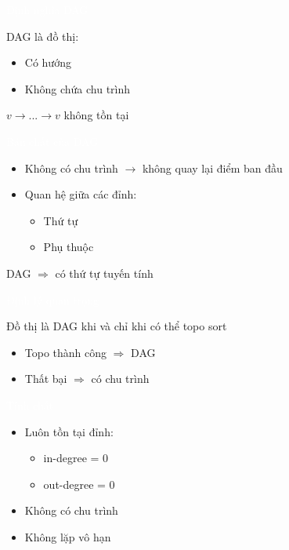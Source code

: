 \documentclass{beamer}
\title{\hlred{DAG - Directed Acyclic Graph}}
\author{Group 3}
\date{\hlcyan{03/2026}}
\newcommand{\hlblue}[1]{\textcolor{myblue}{#1}}
\newcommand{\hlgreen}[1]{\textcolor{mygreen}{#1}}
\newcommand{\hlred}[1]{\textcolor{myred}{#1}}
\newcommand{\hlpurple}[1]{\textcolor{mypurple}{#1}}
\newcommand{\hlwhite}[1]{\textcolor{white}{#1}}
\begin{document}
\frame{\titlepage}


\begin{frame}{\hlwhite{Định nghĩa DAG}}
\begin{tcolorbox}[title=\textbf{\hlgreen{Khái niệm DAG}}]
\hlblue{DAG} là đồ thị:
\begin{itemize}
\item Có hướng
\item Không chứa chu trình
\end{itemize}
\end{tcolorbox}

\begin{tcolorbox}
\centering
\hlpurple{$v \rightarrow ... \rightarrow v$ không tồn tại}
\end{tcolorbox}
\end{frame}

\begin{frame}{\hlwhite{Bản chất của DAG}}
\begin{itemize}
\item Không có chu trình $\rightarrow$ không quay lại điểm ban đầu
\item Quan hệ giữa các đỉnh:
\begin{itemize}
\item \hlblue{Thứ tự}
\item \hlblue{Phụ thuộc}
\end{itemize}
\end{itemize}

\begin{tcolorbox}
\centering
\hlpurple{DAG $\Rightarrow$ có thứ tự tuyến tính}
\end{tcolorbox}
\end{frame}

\begin{frame}{\hlwhite{Định lý quan trọng}}
\begin{tcolorbox}[title=\textbf{\hlgreen{Định lý}}]
Đồ thị là DAG \hlred{khi và chỉ khi} có thể topo sort
\end{tcolorbox}

\begin{itemize}
\item Topo thành công $\Rightarrow$ DAG
\item Thất bại $\Rightarrow$ có chu trình
\end{itemize}
\end{frame}

\begin{frame}{\hlwhite{Tính chất}}
\begin{itemize}
\item Luôn tồn tại đỉnh:
\begin{itemize}
\item \hlblue{in-degree = 0}
\item \hlgreen{out-degree = 0}
\end{itemize}
\item Không có chu trình
\item Không lặp vô hạn
\end{itemize}
\end{frame}
\end{document}
